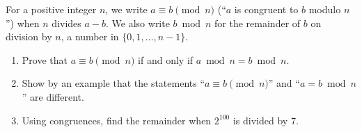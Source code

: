 For a positive integer $n$, we write $a\equiv b\pmod n$ (``$a$ is congruent to $b$ modulo $n$'') when $n$ divides $a-b$. We also write $b\bmod n$ for the remainder of $b$ on division by $n$, a number in $\{0,1,\dots,n-1\}$.
\begin{enumerate}
\item[(a)] Prove that $a\equiv b\pmod n$ if and only if $a\bmod n=b\bmod n$.
\item[(b)] Show by an example that the statements ``$a\equiv b\pmod n$'' and ``$a=b\bmod n$'' are different.
\item[(c)] Using congruences, find the remainder when $2^{100}$ is divided by $7$.
\end{enumerate}
